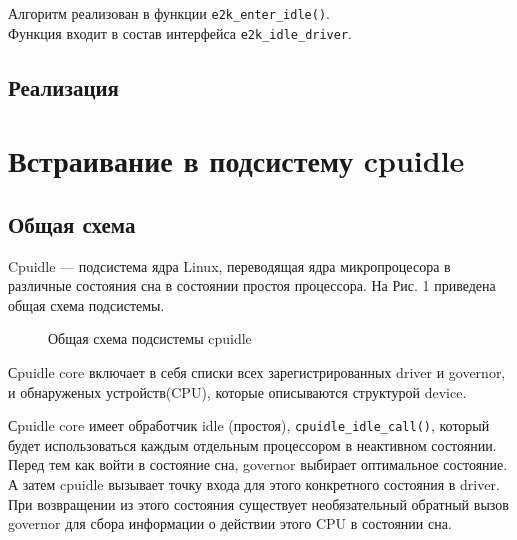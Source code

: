 \documentclass{article}
\begin{document}
Алгоритм реализован в функции \texttt{e2k\_enter\_idle()}.\\ 
Функция входит в состав интерфейса \texttt{e2k\_idle\_driver}.

\subsection{Реализация}
{\small }

\newpage
\section{Встраивание в подсистему cpuidle}



\subsection{Общая схема}

Cpuidle --- подсистема ядра Linux, переводящая ядра микропроцесора в различные состояния сна в состоянии простоя процессора. На Рис. 1 приведена общая схема подсистемы.


\begin{figure}[h]
\caption{Общая схема подсистемы cpuidle}
\end{figure}

Сpuidle core включает в себя списки всех зарегистрированных driver и governor, и обнаруженых устройств(CPU), которые описываются структурой device.

Сpuidle core имеет обработчик idle (простоя), \texttt{cpuidle\_idle\_call()}, который будет использоваться каждым отдельным процессором в неактивном состоянии. Перед тем как войти в состояние сна, governor выбирает оптимальное состояние. А затем cpuidle вызывает точку входа для этого конкретного состояния в driver. При возвращении из этого состояния существует необязательный обратный вызов governor для сбора информации о действии этого CPU в состоянии сна.
\end{document}
